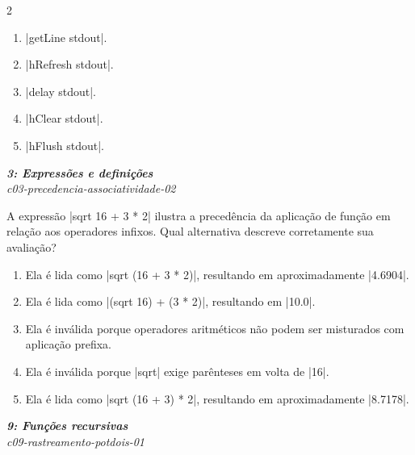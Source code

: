 \documentclass[a4paper,10pt,brazil]{article}
\begin{document}
\begin{multicols}{2}
\begin{enumerate}
  \item \haskellinline|getLine stdout|.

  \item \haskellinline|hRefresh stdout|.

  \item \haskellinline|delay stdout|.

  \item \haskellinline|hClear stdout|.

  \item \haskellinline|hFlush stdout|.


\end{enumerate}

\begin{flushright}
  \footnotesize
  \textit{\textbf{3: Expressões e definições}}\\
  \textit{c03-precedencia-associatividade-02}\\

\end{flushright}
A expressão \haskellinline|sqrt 16 + 3 * 2| ilustra a precedência da aplicação de função em relação aos operadores infixos. Qual alternativa descreve corretamente sua avaliação?

\begin{enumerate}
  \item Ela é lida como \haskellinline|sqrt (16 + 3 * 2)|, resultando em aproximadamente \haskellinline|4.6904|.

  \item Ela é lida como \haskellinline|(sqrt 16) + (3 * 2)|, resultando em \haskellinline|10.0|.

  \item Ela é inválida porque operadores aritméticos não podem ser misturados com aplicação prefixa.

  \item Ela é inválida porque \haskellinline|sqrt| exige parênteses em volta de \haskellinline|16|.

  \item Ela é lida como \haskellinline|sqrt (16 + 3) * 2|, resultando em aproximadamente \haskellinline|8.7178|.


\end{enumerate}

\begin{flushright}
  \footnotesize
  \textit{\textbf{9: Funções recursivas}}\\
  \textit{c09-rastreamento-potdois-01}\\


\end{flushright}
\end{multicols}
\end{document}
